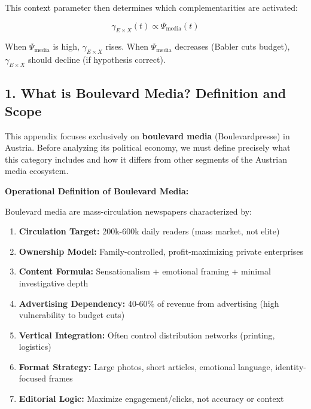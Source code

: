This context parameter then determines which complementarities are activated:

\[
\gamma_{E \times X}(t) \propto \Psi_{\text{media}}(t)
\]

When $\Psi_{\text{media}}$ is high, $\gamma_{E \times X}$ rises. When $\Psi_{\text{media}}$
decreases (Babler cuts budget), $\gamma_{E \times X}$ should decline (if hypothesis
correct).

\label{sec:dx-boulevard-definition}

\subsection*{1. What is Boulevard Media? Definition and Scope}

This appendix focuses exclusively on \textbf{boulevard media} (Boulevardpresse) in Austria.
Before analyzing its political economy, we must define precisely what this category includes
and how it differs from other segments of the Austrian media ecosystem.

\textbf{Operational Definition of Boulevard Media:}

Boulevard media are mass-circulation newspapers characterized by:

\begin{enumerate}
\item \textbf{Circulation Target:} 200k-600k daily readers (mass market, not elite)
\item \textbf{Ownership Model:} Family-controlled, profit-maximizing private enterprises
\item \textbf{Content Formula:} Sensationalism + emotional framing + minimal investigative depth
\item \textbf{Advertising Dependency:} 40-60\% of revenue from advertising (high vulnerability to budget cuts)
\item \textbf{Vertical Integration:} Often control distribution networks (printing, logistics)
\item \textbf{Format Strategy:} Large photos, short articles, emotional language, identity-focused frames
\item \textbf{Editorial Logic:} Maximize engagement/clicks, not accuracy or context
\end{enumerate}

